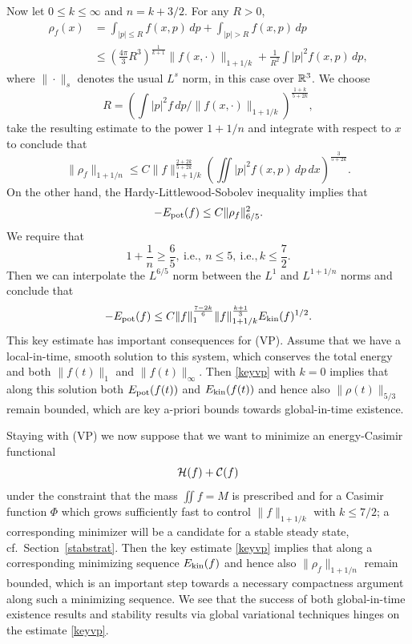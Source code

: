\documentclass[11pt]{article}
\begin{document}
Now let $0\leq k\leq \infty$ and
$n=k+ 3/2$. For any $R>0$,
\begin{align*}
  \rho_f (x)
  &=
  \int_{|p|\leq R} f(x,p)\, dp + \int_{|p| > R} f(x,p)\, dp\\
  &\leq
  \left(\frac{4\pi}{3}R^3\right)^\frac{1}{k+1} \|f(x,\cdot)\|_{1+1/k}
  + \frac{1}{R^2} \int |p|^2 f(x,p)\, dp,
\end{align*}
where $\|\cdot\|_s$ denotes the usual $L^s$ norm, in this case over $\mathbb R^3$.
We choose
\[
R=\left(\int |p|^2 f\, dp/\|f(x,\cdot)\|_{1+1/k}\right)^{\frac{1+k}{5+2 k}},
\]
take the resulting estimate to the power $1+1/n$ and integrate
with respect to $x$ to conclude that
\begin{equation}\label{rhoestvp}
  \|\rho_f\|_{1+1/n} \leq C  \|f\|_{1+1/k}^{\frac{2 + 2 k}{5 + 2 k}}
  \left(\iint |p|^2 f(x,p)\, dp\, dx\right)^{\frac{3}{5 + 2 k}}.
\end{equation}
On the other hand, the Hardy-Littlewood-Sobolev inequality 
\cite[4.3 Thm.]{LiLo} implies that
\[
-E_\mathrm{pot}(f) \leq C \|\rho_f\|_{6/5}^2.
\]
We require that
\[
1+\frac{1}{n} \geq \frac{6}{5},\ \mbox{i.e.},\ n \leq 5,\ \mbox{i.e.},
k \leq \frac{7}{2}.
\]
Then we can interpolate the $L^{6/5}$ norm between the $L^1$ and $L^{1+1/n}$
norms and conclude that
\begin{equation} \label{keyvp}
  -E_\mathrm{pot}(f) \leq C \|f\|_1^{\frac{7-2k}{6}}\|f\|_{1+1/k}^{\frac{k+1}{3}} E_\mathrm{kin}(f)^{1/2}.
\end{equation}
This key estimate has important consequences for (VP). Assume that we have
a local-in-time, smooth solution to this system, which conserves the total
energy and both $\|f(t)\|_1$ and $\|f(t)\|_\infty$.
Then \eqref{keyvp} with $k=0$ implies that along this solution both
$E_\mathrm{pot}(f(t))$ and $E_\mathrm{kin}(f(t))$ and hence also $\|\rho(t)\|_{5/3}$ remain
bounded, which are key a-priori bounds towards global-in-time existence.

Staying with (VP) we now suppose that
we want to minimize an energy-Casimir functional
\[
{\cal H}(f) + {\cal C}(f)
\]
under the constraint that the mass $\iint f=M$ is prescribed
and for a Casimir function $\Phi$ which grows sufficiently fast
to control $\|f\|_{1+1/k}$ with $k\leq 7/2$;
a corresponding minimizer will be a candidate for a stable steady state,
cf.~Section~\ref{stabstrat}. Then the key estimate \eqref{keyvp} implies
that along a corresponding minimizing sequence $E_\mathrm{kin}(f)$ and hence also
$\|\rho_f\|_{1+1/n}$ remain bounded, which is an important step
towards a necessary compactness argument along such a minimizing sequence.
We see that the success of both global-in-time existence results and stability
results via global variational techniques hinges on the estimate \eqref{keyvp}.
\end{document}
